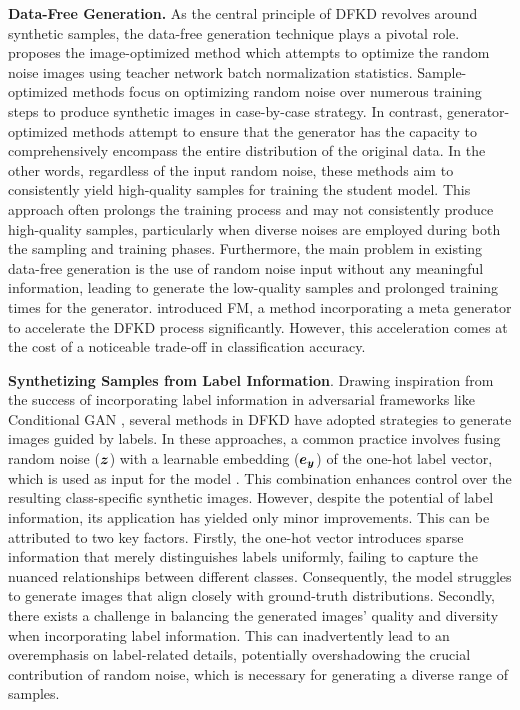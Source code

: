 \documentclass{article} %
\begin{document}
\textbf{Data-Free Generation.} As the central principle of DFKD revolves around synthetic samples, the data-free generation technique plays a pivotal role. \citep{adi} proposes the image-optimized method which attempts to optimize the random noise images using teacher network batch normalization statistics. Sample-optimized methods \citep{cmi,spshnet} focus on optimizing random noise over numerous training steps to produce synthetic images in case-by-case strategy. In contrast, generator-optimized methods \citep{mad,kakr,predfkd} attempt to ensure that the generator has the capacity to comprehensively encompass the entire distribution of the original data. In the other words, regardless of the input random noise, these methods aim to consistently yield high-quality samples for training the student model. This approach often prolongs the training process and may not consistently produce high-quality samples, particularly when diverse noises are employed during both the sampling and training phases. Furthermore, the main problem in existing data-free generation is the use of random noise input without any meaningful information, leading to generate the low-quality samples and prolonged training times for the generator. \citep{fastdfkd} introduced FM, a method incorporating a meta generator to accelerate the DFKD process significantly. However, this acceleration comes at the cost of a noticeable trade-off in classification accuracy.

\textbf{Synthetizing Samples from Label Information}. Drawing inspiration from the success of incorporating label information in adversarial frameworks like Conditional GAN \citep{cgan}, several methods in DFKD have adopted strategies to generate images guided by labels. In these approaches, a common practice involves fusing random noise (${\bm{z}}$) with a learnable embedding (${\bm{e}}_{\bm{y}}$) of the one-hot label vector, which is used as input for the model \citep{cgdfkd1, cgdfkd2, mad}. This combination enhances control over the resulting class-specific synthetic images. However, despite the potential of label information, its application has yielded only minor improvements. This can be attributed to two key factors. Firstly, the one-hot vector introduces sparse information that merely distinguishes labels uniformly, failing to capture the nuanced relationships between different classes. Consequently, the model struggles to generate images that align closely with ground-truth distributions. Secondly, there exists a challenge in balancing the generated images' quality and diversity when incorporating label information. This can inadvertently lead to an overemphasis on label-related details, potentially overshadowing the crucial contribution of random noise, which is necessary for generating a diverse range of samples. 
\end{document}

